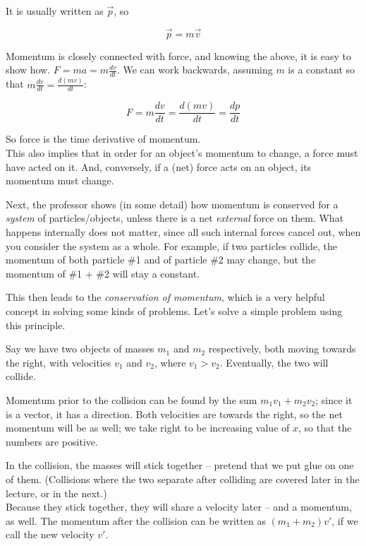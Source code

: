\documentclass[12pt,a4paper]{report}
\begin{document}
It is usually written as $\vec{p}$, so

\begin{equation}
\vec{p} = m \vec{v}
\end{equation}

Momentum is closely connected with force, and knowing the above, it is easy to show how. $\displaystyle F = m a = m \frac{dv}{dt}$. We can work backwards, assuming $m$ is a constant so that $m \frac{dv}{dt} = \frac{d(mv)}{dt}$:

\begin{equation}
F = m \frac{dv}{dt} = \frac{d(mv)}{dt} = \frac{dp}{dt}
\end{equation}

So force is the time derivative of momentum.\\
This also implies that in order for an object's momentum to change, a force must have acted on it. And, conversely, if a (net) force acts on an object, its momentum must change.

Next, the professor shows (in some detail) how momentum is conserved for a \emph{system} of particles/objects, unless there is a net \emph{external} force on them. What happens internally does not matter, since all such internal forces cancel out, when you consider the system as a whole. For example, if two particles collide, the momentum of both particle \#1 and of particle \#2 may change, but the momentum of \#1 + \#2 will stay a constant.

This then leads to the \emph{conservation of momentum}, which is a very helpful concept in solving some kinds of problems. Let's solve a simple problem using this principle.

Say we have two objects of masses $m_1$ and $m_2$ respectively, both moving towards the right, with velocities $v_1$ and $v_2$, where $v_1 > v_2$. Eventually, the two will collide.

Momentum prior to the collision can be found by the sum $m_1 v_1 + m_2 v_2$; since it is a vector, it has a direction. Both velocities are towards the right, so the net momentum will be as well; we take right to be increasing value of $x$, so that the numbers are positive.

In the collision, the masses will stick together -- pretend that we put glue on one of them. (Collisions where the two separate after colliding are covered later in the lecture, or in the next.)\\
Because they stick together, they will share a velocity later -- and a momentum, as well. The momentum after the collision can be written as $(m_1 + m_2) v'$, if we call the new velocity $v'$. 
\end{document}
